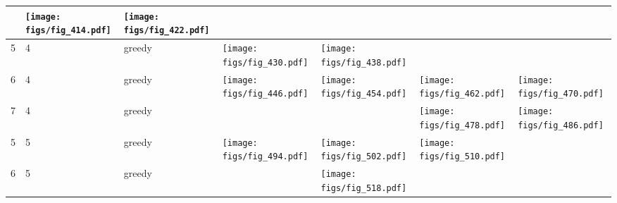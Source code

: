 \documentclass[oneside,canadian,landscape]{article}
\begin{document}
\begin{center}
\begin{longtable}{|l|l|l||l|l|l|l|}
&\begin{minipage}{3.5cm}
\texttt{[image: figs/fig\_414.pdf]}
\end{minipage}
&\begin{minipage}{3.5cm}
\texttt{[image: figs/fig\_422.pdf]}
\end{minipage}
\\ \hline
5&4&greedy&\begin{minipage}{3.5cm}
\texttt{[image: figs/fig\_430.pdf]}
\end{minipage}
&\begin{minipage}{3.5cm}
\texttt{[image: figs/fig\_438.pdf]}
\end{minipage}
&&\\ \hline
6&4&greedy&\begin{minipage}{3.5cm}
\texttt{[image: figs/fig\_446.pdf]}
\end{minipage}
&\begin{minipage}{3.5cm}
\texttt{[image: figs/fig\_454.pdf]}
\end{minipage}
&\begin{minipage}{3.5cm}
\texttt{[image: figs/fig\_462.pdf]}
\end{minipage}
&\begin{minipage}{3.5cm}
\texttt{[image: figs/fig\_470.pdf]}
\end{minipage}
\\ \hline
7&4&greedy&&&\begin{minipage}{3.5cm}
\texttt{[image: figs/fig\_478.pdf]}
\end{minipage}
&\begin{minipage}{3.5cm}
\texttt{[image: figs/fig\_486.pdf]}
\end{minipage}
\\ \hline
5&5&greedy&\begin{minipage}{3.5cm}
\texttt{[image: figs/fig\_494.pdf]}
\end{minipage}
&\begin{minipage}{3.5cm}
\texttt{[image: figs/fig\_502.pdf]}
\end{minipage}
&\begin{minipage}{3.5cm}
\texttt{[image: figs/fig\_510.pdf]}
\end{minipage}
&\\ \hline
6&5&greedy&&\begin{minipage}{3.5cm}
\texttt{[image: figs/fig\_518.pdf]}

\end{minipage}
\end{longtable}
\end{center}
\end{document}
